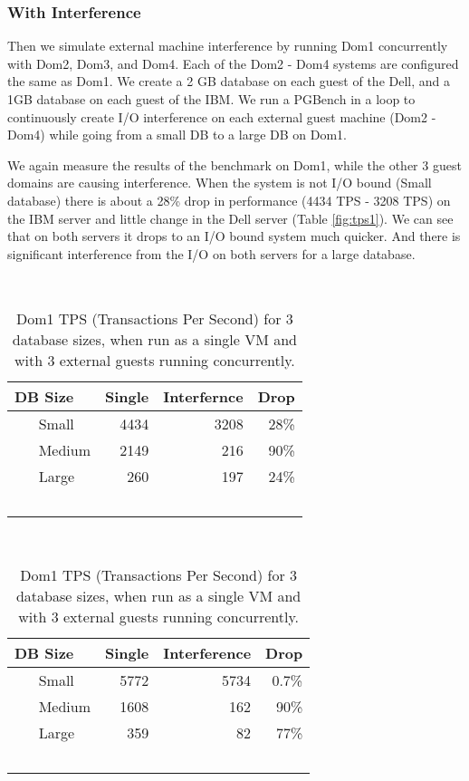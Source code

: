 \subsubsection{With Interference}
Then we simulate external machine interference by running Dom1 concurrently with Dom2, Dom3, and Dom4. Each of the Dom2 - Dom4 systems are configured the same as Dom1.  We create a 2 GB database on each guest of the Dell, and a 1GB database on each guest of the IBM.  We run a PGBench in a loop to continuously create I/O interference on each external guest machine (Dom2 - Dom4) while going from a small DB to a large DB on Dom1.

We again measure the results of the benchmark on Dom1, while the other 3 guest domains are causing interference.  When the system is not I/O bound (Small database) there is about a 28\% drop in performance (4434 TPS - 3208 TPS) on the IBM server and little change in the Dell server (Table \ref{fig:tps1}).  We can see that on both servers it drops to an I/O bound system much quicker.  And there is significant interference from the I/O on both servers for a large database.

\begin{table}[h]
\begin{subtable}[h]{0.45\textwidth}
  \begin{tabular}{ l | r | r | r }
    DB Size & Single & Interfernce & Drop \\
    \hline
    Small & 4434 & 3208 & 28\% \\ \hline
    Medium & 2149 & 216 & 90\% \\ \hline
    Large & 260 & 197 & 24\% \\  \hline
    \hline
  \end{tabular}
\caption{IBM x3650 with 2GB RAM:  Each Guest domain has 512MB Allocated.}
\label{fig:tps1}
\end{subtable}
\hfill
\begin{subtable}[h]{0.45\textwidth}
  \begin{tabular}{ l | r | r | r }
    DB Size & Single & Interference & Drop \\
    \hline
    Small & 5772 & 5734 & 0.7\% \\ \hline
    Medium & 1608 & 162 & 90\% \\ \hline
    Large & 359 & 82 & 77\% \\  \hline
    \hline
  \end{tabular}
\caption{Dell T410 with 8GB RAM:  Each Guest domain has 2GB Allocated. }
\label{fig:tps2}
\end{subtable}
\caption{Dom1 TPS (Transactions Per Second) for 3 database sizes, when run as a single VM and with 3 external guests running concurrently.}
\end{table}

